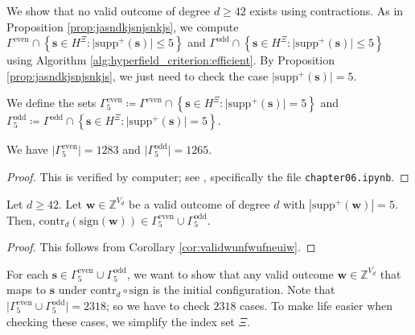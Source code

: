 We show that no valid outcome of degree \( d \geq 42 \) exists using contractions. As in Proposition \ref{prop:jasndkjsnjsnkjs}, we compute \(  \Gamma^{\mathrm{even}} \cap \left\{ \mathbf{s} \in H^{\Xi} : \lvert \mathrm{supp}^+(\mathbf{s}) \rvert \leq 5 \right\} \) and \( \Gamma^{\mathrm{odd}} \cap \left\{ \mathbf{s} \in H^{\Xi} : \lvert \mathrm{supp}^+(\mathbf{s}) \rvert \leq 5 \right\}  \)
using Algorithm \ref{alg:hyperfield_criterion:efficient}. By Proposition \ref{prop:jasndkjsnjsnkjs}, we just need to check the case \( \lvert \mathrm{supp}^+(\mathbf{s}) \rvert = 5 \).



\begin{definition}
    We define the sets \( \Gamma^{\mathrm{even}}_5 \coloneqq \Gamma^{\mathrm{even}} \cap \left\{ \mathbf{s} \in H^{\Xi} : \lvert \mathrm{supp}^+(\mathbf{s}) \rvert = 5 \right\} \) and \( \Gamma^{\mathrm{odd}}_5 \coloneqq \Gamma^{\mathrm{odd}} \cap \left\{ \mathbf{s} \in H^{\Xi} : \lvert \mathrm{supp}^+(\mathbf{s}) \rvert = 5 \right\} \).
\end{definition}

\begin{proposition}
    We have \( \lvert \Gamma^{\mathrm{even}}_5 \rvert  = 1283\) and \( \lvert \Gamma^{\mathrm{odd}}_5 \rvert  = 1265\).
\end{proposition}

\begin{proof}
    This is verified by computer; see \cite{ducrepo}, specifically the file \texttt{chapter06.ipynb}.
\end{proof}

\begin{corollary}
    Let \( d\geq 42 \). Let \( \mathbf{w} \in \mathbb{Z}^{V_d} \) be a valid outcome of degree \( d \) with \( |\mathrm{supp}^+(\mathbf w)| = 5 \). Then, \( \mathrm{contr}_d(\mathrm{sign}(\mathbf{w})) \in \Gamma^{\mathrm{even}}_5 \cup \Gamma^{\mathrm{odd}}_5 \).
\end{corollary}

\begin{proof}
    This follows from Corollary \ref{cor:validwunfwufneuiw}.
\end{proof}

For each \( \mathbf{s} \in \Gamma^{\mathrm{even}}_5 \cup \Gamma^{\mathrm{odd}}_5 \), we want to show that any valid outcome \( \mathbf{w} \in \mathbb{Z}^{V_d} \) that maps to \( \mathbf{s} \) under \( \mathrm{contr}_d \circ \mathrm{sign} \) is the initial configuration. Note that \( \lvert \Gamma^{\mathrm{even}}_5 \cup \Gamma^{\mathrm{odd}}_5 \rvert = 2318 \); so we have to check \( 2318 \) cases. To make life easier when checking these cases, we simplify the index set \( \Xi \).

